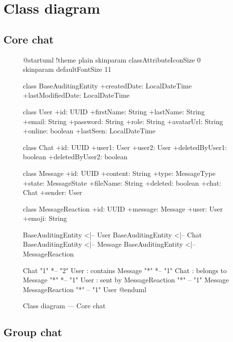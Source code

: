 \documentclass[12pt,a4paper]{report}
\begin{document}
\section{Class diagram}

\subsection{Core chat}

\begin{figure}[H]
    \centering
    \begin{plantuml}
        @startuml
        !theme plain
        skinparam classAttributeIconSize 0
        skinparam defaultFontSize 11

        class BaseAuditingEntity {
            +createdDate: LocalDateTime
            +lastModifiedDate: LocalDateTime
        }

        class User {
            +id: UUID
            +firstName: String
            +lastName: String
            +email: String
            +password: String
            +role: String
            +avatarUrl: String
            +online: boolean
            +lastSeen: LocalDateTime
        }

        class Chat {
            +id: UUID
            +user1: User
            +user2: User
            +deletedByUser1: boolean
            +deletedByUser2: boolean
        }

        class Message {
            +id: UUID
            +content: String
            +type: MessageType
            +state: MessageState
            +fileName: String
            +deleted: boolean
            +chat: Chat
            +sender: User
        }

        class MessageReaction {
            +id: UUID
            +message: Message
            +user: User
            +emoji: String
        }

        BaseAuditingEntity <|-- User
        BaseAuditingEntity <|-- Chat
        BaseAuditingEntity <|-- Message
        BaseAuditingEntity <|-- MessageReaction

        Chat "1" *-- "2" User : contains
        Message "*" *-- "1" Chat : belongs to
        Message "*" *-- "1" User : sent by
        MessageReaction "*" -- "1" Message
        MessageReaction "*" -- "1" User
        @enduml
    \end{plantuml}
    \caption{Class diagram --- Core chat}
\end{figure}

\subsection{Group chat}
\end{document}
